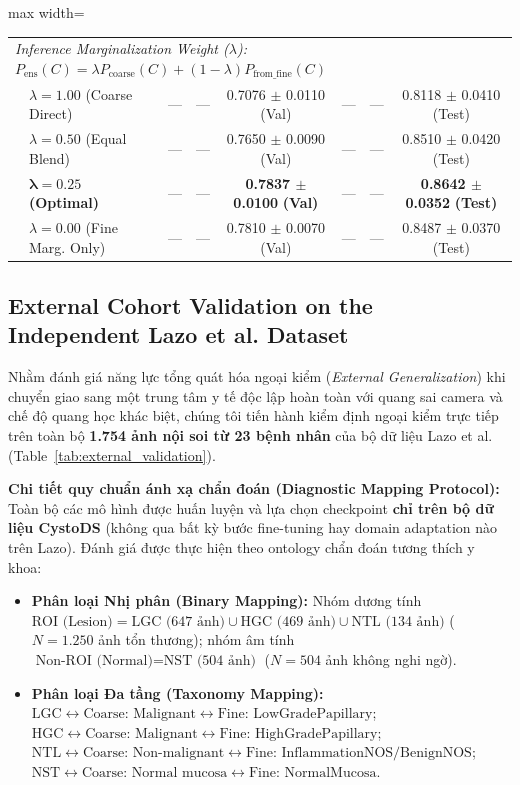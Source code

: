 \documentclass[runningheads]{llncs}
\begin{document}
\begin{table}[t]
\begin{adjustbox}{max width=\textwidth}
\begin{tabular}{llcccccc}
\midrule
\multicolumn{8}{l}{\textit{Inference Marginalization Weight ($\lambda$): $P_{\text{ens}}(C) = \lambda P_{\text{coarse}}(C) + (1-\lambda) P_{\text{from\_fine}}(C)$}} \\
& $\lambda = 1.00$ (Coarse Direct) & --- & --- & 0.7076 $\pm$ 0.0110 (Val) & --- & --- & 0.8118 $\pm$ 0.0410 (Test) \\
& $\lambda = 0.50$ (Equal Blend) & --- & --- & 0.7650 $\pm$ 0.0090 (Val) & --- & --- & 0.8510 $\pm$ 0.0420 (Test) \\
& $\mathbf{\lambda = 0.25}$ \textbf{(Optimal)} & --- & --- & \textbf{0.7837 $\pm$ 0.0100} \textbf{(Val)} & --- & --- & \textbf{0.8642 $\pm$ 0.0352} \textbf{(Test)} \\
& $\lambda = 0.00$ (Fine Marg. Only) & --- & --- & 0.7810 $\pm$ 0.0070 (Val) & --- & --- & 0.8487 $\pm$ 0.0370 (Test) \\
\bottomrule
\end{tabular}
\end{adjustbox}
\end{table}

\FloatBarrier
\subsection{External Cohort Validation on the Independent Lazo et al. Dataset}
\label{sec:external_validation}
Nhằm đánh giá năng lực tổng quát hóa ngoại kiểm (\textit{External Generalization}) khi chuyển giao sang một trung tâm y tế độc lập hoàn toàn với quang sai camera và chế độ quang học khác biệt, chúng tôi tiến hành kiểm định ngoại kiểm trực tiếp trên toàn bộ \textbf{1.754 ảnh nội soi từ 23 bệnh nhân} của bộ dữ liệu Lazo et al. \cite{ref_lazo2023semisupervised} (Table~\ref{tab:external_validation}).

\noindent \textbf{Chi tiết quy chuẩn ánh xạ chẩn đoán (Diagnostic Mapping Protocol):}
Toàn bộ các mô hình được huấn luyện và lựa chọn checkpoint \textbf{chỉ trên bộ dữ liệu CystoDS} (không qua bất kỳ bước fine-tuning hay domain adaptation nào trên Lazo). Đánh giá được thực hiện theo ontology chẩn đoán tương thích y khoa:
\begin{itemize}
    \item \textbf{Phân loại Nhị phân (Binary Mapping):} Nhóm dương tính $\text{ROI (Lesion)} = \text{LGC (647 ảnh)} \cup \text{HGC (469 ảnh)} \cup \text{NTL (134 ảnh)}$ ($N=1.250$ ảnh tổn thương); nhóm âm tính $\text{Non-ROI (Normal)} = \text{NST (504 ảnh)}$ ($N=504$ ảnh không nghi ngờ).
    \item \textbf{Phân loại Đa tầng (Taxonomy Mapping):} $\text{LGC} \leftrightarrow \text{Coarse: Malignant} \leftrightarrow \text{Fine: LowGradePapillary}$; $\text{HGC} \leftrightarrow \text{Coarse: Malignant} \leftrightarrow \text{Fine: HighGradePapillary}$; $\text{NTL} \leftrightarrow \text{Coarse: Non-malignant} \leftrightarrow \text{Fine: InflammationNOS/BenignNOS}$; $\text{NST} \leftrightarrow \text{Coarse: Normal mucosa} \leftrightarrow \text{Fine: NormalMucosa}$.
\end{itemize}
\end{document}
